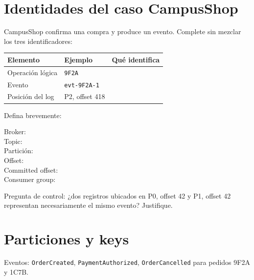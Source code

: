\documentclass[variant=guia,cover=institutional,mode=print]{ua-engineering-v6-article}
\begin{document}
\newpage
\section{Identidades del caso CampusShop}

CampusShop confirma una compra y produce un evento. Complete sin mezclar los tres identificadores:

\begin{center}
\begin{tabular}{p{}p{}p{}}
\toprule
Elemento & Ejemplo & Qué identifica \\
\midrule
Operación lógica & \texttt{9F2A} & \rule{0pt}{1.05cm} \\
Evento & \texttt{evt-9F2A-1} & \rule{0pt}{1.05cm} \\
Posición del log & P2, offset 418 & \rule{0pt}{1.05cm} \\
\bottomrule
\end{tabular}
\end{center}

Defina brevemente:

\begin{description}
\item[Broker:] \hrulefill
\item[Topic:] \hrulefill
\item[Partición:] \hrulefill
\item[Offset:] \hrulefill
\item[Committed offset:] \hrulefill
\item[Consumer group:] \hrulefill
\end{description}

\begin{uawarn}
Pregunta de control: ¿dos registros ubicados en P0, offset 42 y P1, offset 42 representan necesariamente el mismo evento? Justifique.
\end{uawarn}

\newpage
\section{Particiones y keys}

Eventos: \texttt{OrderCreated}, \texttt{PaymentAuthorized}, \texttt{OrderCancelled} para pedidos 9F2A y 1C7B.

\begin{center}
\end{center}
\end{document}

